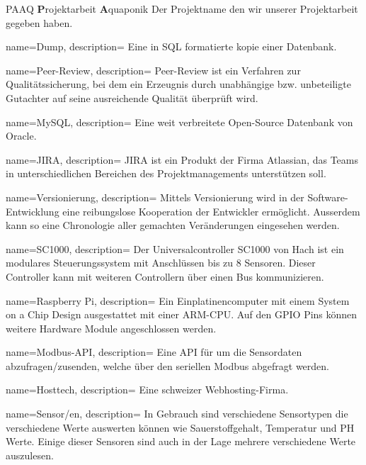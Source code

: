 	{PAAQ}
	{\textbf{P}rojektarbeit \textbf{A}quaponik}
	{
		Der Projektname den wir unserer Projektarbeit gegeben haben.
	}



{
	name=Dump,
	description={
		Eine in SQL formatierte kopie einer Datenbank.
	}
}


{
	name=Peer-Review,
	description={
		Peer-Review ist ein Verfahren zur Qualitätssicherung, bei dem ein Erzeugnis durch unabhängige bzw. unbeteiligte Gutachter auf seine ausreichende Qualität überprüft wird.
	}
}

{
	name=MySQL,
	description={
		Eine weit verbreitete Open-Source Datenbank von Oracle.
	}
}

{
	name=JIRA,
	description={
		JIRA ist ein Produkt der Firma Atlassian, das Teams in unterschiedlichen Bereichen des Projektmanagements unterstützen soll.
	}
}

{
	name=Versionierung,
	description={
		Mittels Versionierung wird in der Software-Entwicklung eine reibungslose Kooperation der Entwickler ermöglicht. Ausserdem kann so eine Chronologie aller gemachten Veränderungen eingesehen werden.
	}
}

{
	name=SC1000,
	description={
		Der Universalcontroller SC1000 von Hach ist ein modulares Steuerungssystem mit Anschlüssen bis zu 8 Sensoren. Dieser Controller kann mit weiteren Controllern über einen Bus kommunizieren.
	}
}

{
	name=Raspberry Pi,
	description={
		Ein Einplatinencomputer mit einem System on a Chip Design ausgestattet mit einer ARM-CPU. Auf den GPIO Pins können weitere Hardware Module angeschlossen werden.
	}
}

{
	name=Modbus-API,
	description={
		Eine API für um die Sensordaten abzufragen/zusenden, welche über den seriellen Modbus abgefragt werden.
	}
}

{
	name=Hosttech,
	description={
		Eine schweizer Webhosting-Firma.
	}
}

{
	name=Sensor/en,
	description={
		In Gebrauch sind verschiedene Sensortypen die verschiedene Werte auswerten können wie Sauerstoffgehalt, Temperatur und PH Werte. Einige dieser Sensoren sind auch in der Lage mehrere verschiedene Werte auszulesen.
	}
}


